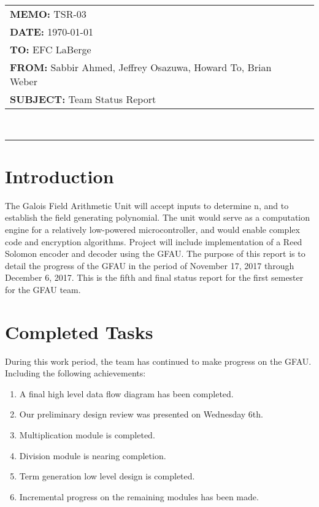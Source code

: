 \documentclass[paper=usletter, fontsize=12pt]{article}
\newcommand{\Sabbir}{Sabbir Ahmed}
\newcommand{\Jeffrey}{Jeffrey Osazuwa}
\newcommand{\Howard}{Howard To}
\newcommand{\Brian}{Brian Weber}
\newcommand{\documentinfo}[5]{
    \begin{centering}
        \parbox{6.8in}{
        \begin{spacing}{1}
            \begin{flushleft}
                \begin{tabular}{l l} #1 \\ #2 \\ #3 \\ #4 \\ #5 \\
                \end{tabular} \\
                \rule{\textwidth}{1pt}
            \end{flushleft}
        \end{spacing} }
    \end{centering} }
\begin{document}
    \documentinfo{\textbf{MEMO:} TSR-03}{\textbf{DATE: }{\today}}{\textbf{TO: }
    EFC LaBerge}{\textbf{FROM: }\Sabbir, \Jeffrey, \Howard,
    \Brian}{\textbf{SUBJECT: } Team Status Report}
    \vspace{-0.3in}

    \section{Introduction} The Galois Field Arithmetic Unit will accept inputs
    to determine n, and to establish the field generating polynomial. The unit
    would serve as a computation engine for a relatively low-powered
    microcontroller, and would enable complex code and encryption algorithms.
    Project will include implementation of a Reed Solomon encoder and decoder
    using the GFAU. The purpose of this report is to detail the progress of the
    GFAU in the period of November 17, 2017 through December 6, 2017. This is
    the fifth and final status report for the first semester for the GFAU
    team.

    \section{Completed Tasks} During this work period, the team has continued
    to make progress on the GFAU. Including the following achievements:
    \begin{enumerate}[label=\alph*)]

        \item A final high level data flow diagram has been completed.

        \item Our preliminary design review was presented on Wednesday 6th. 

        \item Multiplication module is completed.

        \item Division module is nearing completion.

        \item Term generation low level design is completed.

        \item Incremental progress on the remaining modules has been made.

    \end{enumerate}
\end{document}
